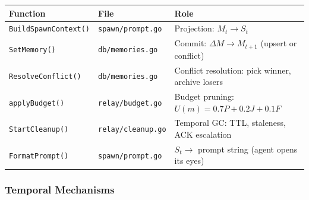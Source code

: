 \documentclass[11pt]{article}
\begin{document}
\begin{longtable}[]{@{}
  >{\raggedright\arraybackslash}p{}
  >{\raggedright\arraybackslash}p{}
  >{\raggedright\arraybackslash}p{}@{}}
\toprule\noalign{}
\begin{minipage}[b]{\linewidth}\raggedright
Function
\end{minipage} & \begin{minipage}[b]{\linewidth}\raggedright
File
\end{minipage} & \begin{minipage}[b]{\linewidth}\raggedright
Role
\end{minipage} \\
\midrule\noalign{}
\endhead
\bottomrule\noalign{}
\endlastfoot
\texttt{BuildSpawnContext()} & \texttt{spawn/prompt.go} & Projection:
\(M_t \to S_t\) \\
\texttt{SetMemory()} & \texttt{db/memories.go} & Commit:
\(\Delta M \to M_{t+1}\) (upsert or conflict) \\
\texttt{ResolveConflict()} & \texttt{db/memories.go} & Conflict
resolution: pick winner, archive losers \\
\texttt{applyBudget()} & \texttt{relay/budget.go} & Budget pruning:
\(U(m) = 0.7P + 0.2J + 0.1F\) \\
\texttt{StartCleanup()} & \texttt{relay/cleanup.go} & Temporal GC: TTL,
staleness, ACK escalation \\
\texttt{FormatPrompt()} & \texttt{spawn/prompt.go} & \(S_t \to\) prompt
string (agent opens its eyes) \\
\end{longtable}

\subsubsection{Temporal Mechanisms}\label{temporal-mechanisms}
\end{document}
